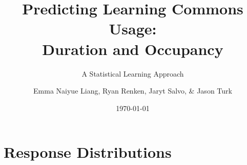 \documentclass{beamer}
\title{Predicting Learning Commons Usage:\\Duration and Occupancy}
\subtitle{A Statistical Learning Approach}
\author{Emma Naiyue Liang, Ryan Renken, Jaryt Salvo, \& Jason Turk}
\institute{MATH 7550 Statistical Learning \textbar\textbar \space BGSU}
\date{\today}
\begin{document}
\begin{frame}
\titlepage
\end{frame}

\section{Response Distributions}

            
                
\end{document}
